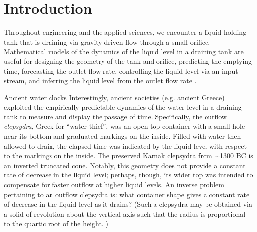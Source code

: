 \documentclass[openacc]{rsproca_new}%
\begin{document}

\section{Introduction}
Throughout engineering and the applied sciences, we encounter a liquid-holding tank that is draining via gravity-driven flow through a small orifice.
Mathematical models of the dynamics of the liquid level in a draining tank are useful for designing the geometry of the tank and orifice, predicting the emptying time, forecasting the outlet flow rate, controlling the liquid level via an input stream, and inferring the liquid level from the outlet flow rate \cite{d2021torricelli,seborg2016process,groetsch1993inverse,groetsch1999inverse}.

\begin{mytcbox}[label=box:waterclocks, breakable]{Ancient water clocks}
Interestingly, ancient societies (e.g. ancient Greece) exploited the empirically predictable dynamics of the water level in a draining tank to measure and display the passage of time.
Specifically, the outflow \emph{clepsydra}, Greek for ``water thief'', was an open-top container with a small hole near its bottom and graduated markings on the inside. 
Filled with water then allowed to drain, the elapsed time was indicated by the liquid level with respect to the markings on the inside. \cite{bedini1962compartmented,hwang2021historical,ritner2016oriental,hejun1987research,schomberg2018karnak,mills1982newton}
The preserved Karnak clepsydra from $\sim$1300 BC \cite{schomberg2018karnak} is an inverted truncated cone. Notably, this geometry does not provide a constant rate of decrease in the liquid level; perhaps, though, its wider top was intended to compensate for faster outflow at higher liquid levels. An inverse problem pertaining to an outflow clepsydra is: what container shape gives a constant rate of decrease in the liquid level as it drains?
(Such a clepsydra may be obtained via a solid of revolution about the vertical axis such that the radius is proportional to the quartic root of the height. \cite{mills1982newton,d2021torricelli})
\end{mytcbox}
\end{document}
